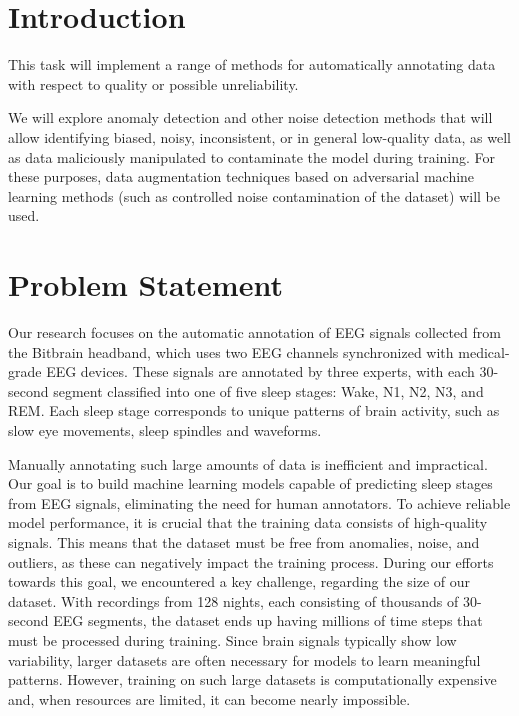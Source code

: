 
\section{Introduction}

This task will implement a range of methods for automatically
annotating data with respect to quality or possible unreliability.

We will explore anomaly detection and other noise detection methods
that will allow identifying biased, noisy, inconsistent, or in general
low-quality data, as well as data maliciously manipulated to
contaminate the model during training. For these purposes, data
augmentation techniques based on adversarial machine learning methods
(such as controlled noise contamination of the dataset) will be used.

\section{Problem Statement}

Our research focuses on the automatic annotation of EEG signals collected from the Bitbrain headband, which uses two EEG channels synchronized with medical-grade EEG devices. These signals are annotated by three experts, with each 30-second segment classified into one of five sleep stages: Wake, N1, N2, N3, and REM. Each sleep stage corresponds to unique patterns of brain activity, such as slow eye movements, sleep spindles and waveforms.

Manually annotating such large amounts of data is inefficient and impractical. Our goal is to build machine learning models capable of predicting sleep stages from EEG signals, eliminating the need for human annotators. To achieve reliable model performance, it is crucial that the training data consists of high-quality signals. This means that the dataset must be free from anomalies, noise, and outliers, as these can negatively impact the training process. During our efforts towards this goal, we encountered a key challenge, regarding the size of our dataset. With recordings from 128 nights, each consisting of thousands of 30-second EEG segments, the dataset ends up having millions of time steps that must be processed during training. Since brain signals typically show low variability, larger datasets are often necessary for models to learn meaningful patterns. However, training on such large datasets is computationally expensive and, when resources are limited, it can become nearly impossible.

